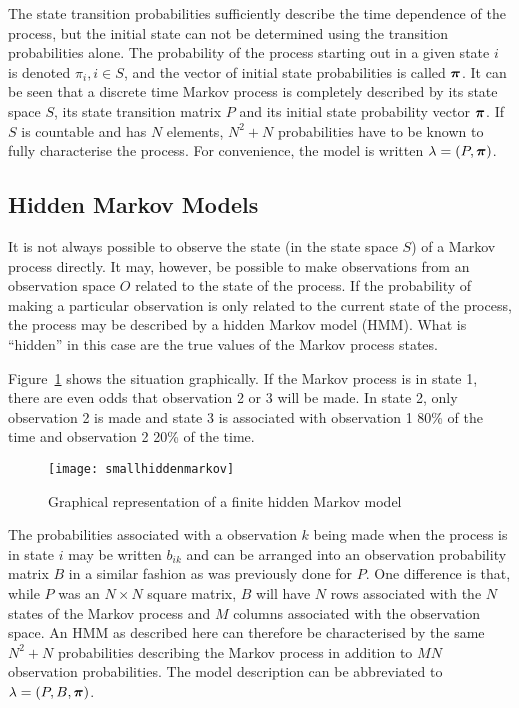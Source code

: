The state transition probabilities sufficiently describe the time dependence of the process, but the initial state can not be determined using the transition probabilities alone.
The probability of the process starting out in a given state $i$ is denoted $\pi_i, i \in S$, and the vector of initial state probabilities is called
$\boldsymbol{\pi}$.
It can be seen that a discrete time Markov process is completely described by its state space $S$, its state transition matrix $P$ and its initial state probability vector $\boldsymbol{\pi}$.  
If $S$ is countable and has $N$ elements, $N^2 + N$ probabilities have to be known to fully characterise the process.
For convenience, the model is written $\lambda = (P, \boldsymbol{\pi})$.

\subsection{Hidden Markov Models} 
It is not always possible to observe the state (in the state space
$S$) of a Markov process directly. It may, however, be possible to
make observations from an observation space $O$ related to the state
of the process. If the probability of making a particular observation
is only related to the current state of the process, the process may
be described by a hidden Markov model (HMM). What is ``hidden'' in
this case are the true values of the Markov process states.

Figure~\ref{fig:hiddenmarkov} shows the situation graphically. If the
Markov process is in state 1, there are even odds that observation 2
or 3 will be made. In state 2, only observation 2 is made and state 3
is associated with observation 1 80\% of the time and observation 2
20\% of the time.

\begin{figure}[htbp]
  \centering
  \texttt{[image: smallhiddenmarkov]}
  \caption{Graphical representation of a finite hidden Markov model}
  \label{fig:hiddenmarkov}
\end{figure}

The probabilities associated with a observation $k$ being made when
the process is in state $i$ may be written $b_{ik}$ and can be
arranged into an observation probability matrix $B$ in a similar
fashion as was previously done for $P$. One difference is that, while
$P$ was an $N \times N$ square matrix, $B$ will have $N$ rows
associated with the $N$ states of the Markov process and $M$ columns
associated with the observation space. An HMM as described here can
therefore be characterised by the same $N^2+N$ probabilities describing
the Markov process in addition to $MN$ observation probabilities.  The
model description can be abbreviated to $\lambda = (P, B, \boldsymbol{\pi})$.

